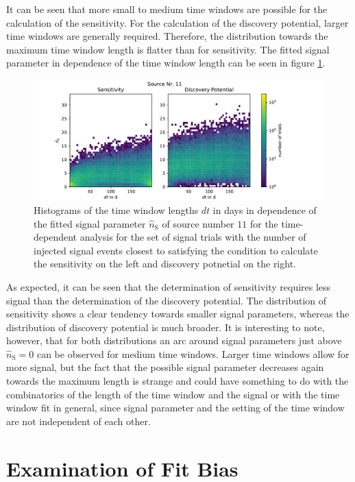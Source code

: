 It can be seen that more small to medium time windows are possible for the calculation of the sensitivity.
For the calculation of the discovery potential, larger time windows are generally required.
Therefore, the distribution towards the maximum time window length is flatter than for sensitivity.
The fitted signal parameter in dependence of the time window length can be seen in figure \ref{fig:sens_disc_ns_dt_1}.
\begin{figure}
    \centering
    \includegraphics[width=\linewidth]{Plots/05_csky/time_window_ns_disc_sens_time_dep_1.pdf}
    \caption{Histograms of the time window lengths $dt$ in days in dependence of the fitted signal parameter $\hat{n}_\text{S}$ of source number $\num{11}$ for the time-dependent analysis for the set of signal trials with the number of injected signal events closest to satisfying the condition to calculate the sensitivity on the left and discovery potnetial on the right.}
    \label{fig:sens_disc_ns_dt_1}
\end{figure}
As expected, it can be seen that the determination of sensitivity requires less signal than the determination of the discovery potential.
The distribution of sensitivity shows a clear tendency towards smaller signal parameters, whereas the distribution of discovery potential is much broader.
It is interesting to note, however, that for both distributions an arc around signal parameters just above $\hat{n}_\text{S}=0$ can be observed for medium time windows.
Larger time windows allow for more signal, but the fact that the possible signal parameter decreases again towards the maximum length is strange and could have something to do with the combinatorics of the length of the time window and the signal or with the time window fit in general, since signal parameter and the setting of the time window are not independent of each other.

\section{Examination of Fit Bias}


